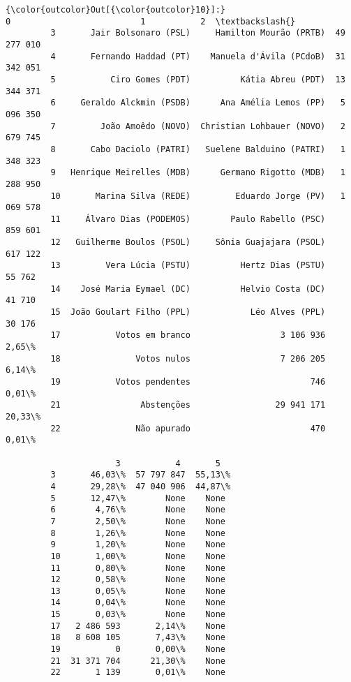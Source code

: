 \documentclass[11pt]{article}
\begin{document}
\begin{Verbatim}[commandchars=\\\{\}]
{\color{outcolor}Out[{\color{outcolor}10}]:}                            0                          1           2  \textbackslash{}
         3       Jair Bolsonaro (PSL)     Hamilton Mourão (PRTB)  49 277 010   
         4       Fernando Haddad (PT)    Manuela d'Ávila (PCdoB)  31 342 051   
         5           Ciro Gomes (PDT)          Kátia Abreu (PDT)  13 344 371   
         6     Geraldo Alckmin (PSDB)      Ana Amélia Lemos (PP)   5 096 350   
         7         João Amoêdo (NOVO)  Christian Lohbauer (NOVO)   2 679 745   
         8       Cabo Daciolo (PATRI)   Suelene Balduino (PATRI)   1 348 323   
         9   Henrique Meirelles (MDB)      Germano Rigotto (MDB)   1 288 950   
         10       Marina Silva (REDE)         Eduardo Jorge (PV)   1 069 578   
         11     Álvaro Dias (PODEMOS)        Paulo Rabello (PSC)     859 601   
         12   Guilherme Boulos (PSOL)     Sônia Guajajara (PSOL)     617 122   
         13         Vera Lúcia (PSTU)          Hertz Dias (PSTU)      55 762   
         14    José Maria Eymael (DC)          Helvio Costa (DC)      41 710   
         15  João Goulart Filho (PPL)            Léo Alves (PPL)      30 176   
         17           Votos em branco                  3 106 936       2,65\%   
         18               Votos nulos                  7 206 205       6,14\%   
         19           Votos pendentes                        746       0,01\%   
         21                Abstenções                 29 941 171      20,33\%   
         22               Não apurado                        470       0,01\%   
         
                      3           4       5  
         3       46,03\%  57 797 847  55,13\%  
         4       29,28\%  47 040 906  44,87\%  
         5       12,47\%        None    None  
         6        4,76\%        None    None  
         7        2,50\%        None    None  
         8        1,26\%        None    None  
         9        1,20\%        None    None  
         10       1,00\%        None    None  
         11       0,80\%        None    None  
         12       0,58\%        None    None  
         13       0,05\%        None    None  
         14       0,04\%        None    None  
         15       0,03\%        None    None  
         17   2 486 593       2,14\%    None  
         18   8 608 105       7,43\%    None  
         19           0       0,00\%    None  
         21  31 371 704      21,30\%    None  
         22       1 139       0,01\%    None  
\end{Verbatim}
            
\end{document}
